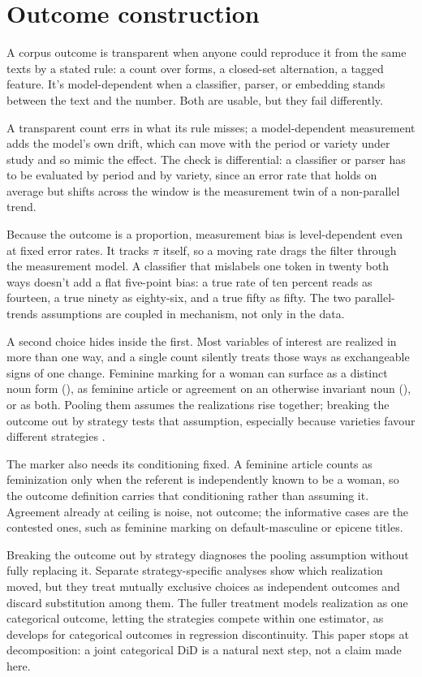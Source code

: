 \section{Outcome construction}
\label{sec:outcomes}

A corpus outcome is transparent when anyone could reproduce it from the same texts by a stated rule: a count over forms, a closed-set alternation, a tagged feature. It's model-dependent when a classifier, parser, or embedding stands between the text and the number. Both are usable, but they fail differently.

A transparent count errs in what its rule misses; a model-dependent measurement adds the model's own drift, which can move with the period or variety under study and so mimic the effect. The check is differential: a classifier or parser has to be evaluated by period and by variety, since an error rate that holds on average but shifts across the window is the measurement twin of a non-parallel trend.

Because the outcome is a proportion, measurement bias is level-dependent even at fixed error rates. It tracks $\pi$ itself, so a moving rate drags the filter through the measurement model. A classifier that mislabels one token in twenty both ways doesn't add a flat five-point bias: a true rate of ten percent reads as fourteen, a true ninety as eighty-six, and a true fifty as fifty. The two parallel-trends assumptions are coupled in mechanism, not only in the data.

A second choice hides inside the first. Most variables of interest are realized in more than one way, and a single count silently treats those ways as exchangeable signs of one change. Feminine marking for a woman can surface as a distinct noun form (), as feminine article or agreement on an otherwise invariant noun (), or as both. Pooling them assumes the realizations rise together; breaking the outcome out by strategy tests that assumption, especially because varieties favour different strategies \citep{Dawes2003}.

The marker also needs its conditioning fixed. A feminine article counts as feminization only when the referent is independently known to be a woman, so the outcome definition carries that conditioning rather than assuming it. Agreement already at ceiling is noise, not outcome; the informative cases are the contested ones, such as feminine marking on default-masculine or epicene titles.

Breaking the outcome out by strategy diagnoses the pooling assumption without fully replacing it. Separate strategy-specific analyses show which realization moved, but they treat mutually exclusive choices as independent outcomes and discard substitution among them. The fuller treatment models realization as one categorical outcome, letting the strategies compete within one estimator, as \textcite{Xu2017} develops for categorical outcomes in regression discontinuity. This paper stops at decomposition: a joint categorical DiD is a natural next step, not a claim made here.

